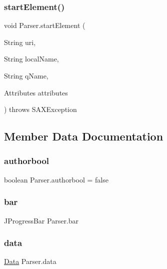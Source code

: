 \hypertarget{class_parser_a6ca2235d63e8d6ce30a4a7c3e2deb523}{}\label{class_parser_a6ca2235d63e8d6ce30a4a7c3e2deb523} 
\subsubsection{\texorpdfstring{start\+Element()}{startElement()}}
{\footnotesize\ttfamily void Parser.\+start\+Element (\begin{DoxyParamCaption}\item[{String}]{uri,  }\item[{String}]{local\+Name,  }\item[{String}]{q\+Name,  }\item[{Attributes}]{attributes }\end{DoxyParamCaption}) throws S\+A\+X\+Exception}



\subsection{Member Data Documentation}
\hypertarget{class_parser_a38dd69bd41bda280db654f766a953664}{}\label{class_parser_a38dd69bd41bda280db654f766a953664} 
\subsubsection{\texorpdfstring{authorbool}{authorbool}}
{\footnotesize\ttfamily boolean Parser.\+authorbool = false\hspace{0.3cm}{\ttfamily [private]}}

\hypertarget{class_parser_a87d020032494150614c01d977277eda3}{}\label{class_parser_a87d020032494150614c01d977277eda3} 
\subsubsection{\texorpdfstring{bar}{bar}}
{\footnotesize\ttfamily J\+Progress\+Bar Parser.\+bar\hspace{0.3cm}{\ttfamily [private]}}

\hypertarget{class_parser_a7eaf97b8d7225ee9f312d7d1c0c96d11}{}\label{class_parser_a7eaf97b8d7225ee9f312d7d1c0c96d11} 
\subsubsection{\texorpdfstring{data}{data}}
{\footnotesize\ttfamily \hyperlink{class_data}{Data} Parser.\+data\hspace{0.3cm}{\ttfamily [private]}}

